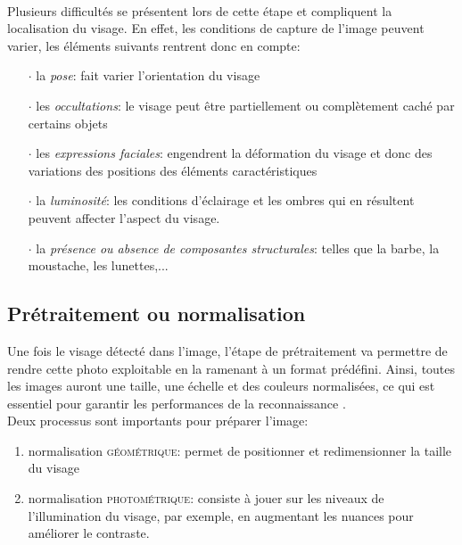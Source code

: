 \paragraph{}
Plusieurs difficultés se présentent lors de cette étape et compliquent la localisation du visage. En effet, les conditions de capture de l'image peuvent varier, les éléments suivants rentrent donc en compte:
\begin{itemize}
\item[$\cdot$]la \textit{pose}: fait varier l'orientation du visage
\item[$\cdot$]les \textit{occultations}: le visage peut être partiellement ou complètement caché par certains objets
\item[$\cdot$]les \textit{expressions faciales}: engendrent la déformation du visage et donc des variations des positions des éléments caractéristiques
\item[$\cdot$]la \textit{luminosité}: les conditions d'éclairage et les ombres qui en résultent peuvent affecter l'aspect du visage.
\item[$\cdot$]la \textit{présence ou absence de composantes structurales}: telles que la barbe, la moustache, les lunettes,...
\end{itemize}

\subsection{Prétraitement ou normalisation}
Une fois le visage détecté dans l'image, l'étape de prétraitement va permettre de rendre cette photo exploitable en la ramenant à un format prédéfini. Ainsi, toutes les images auront une taille, une échelle et des couleurs normalisées, ce qui est essentiel pour garantir les performances de la reconnaissance \cite{Xthesis_1}.
\\
Deux processus sont importants pour préparer l'image:
\begin{enumerate}
\item normalisation \textsc{géométrique}: permet de positionner et redimensionner la taille du visage
\item normalisation \textsc{photométrique}: consiste à jouer sur les niveaux de l'illumination du visage, par exemple, en augmentant les nuances pour améliorer le contraste.
\end{enumerate}


